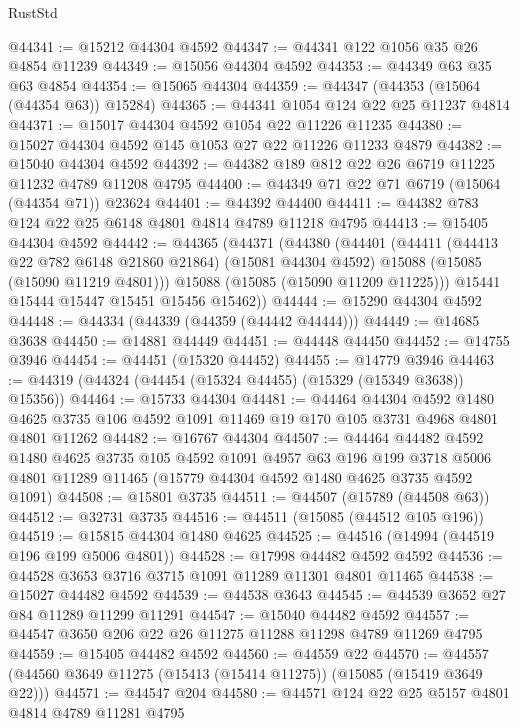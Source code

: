 \begin{lexlean}{RustStd}
\begin{coremodule}
@44341 := @15212 @44304 @4592
@44347 := @44341 @122 @1056 @35 @26 @4854 @11239
@44349 := @15056 @44304 @4592
@44353 := @44349 @63 @35 @63 @4854
@44354 := @15065 @44304
@44359 := @44347 (@44353 (@15064 (@44354 @63)) @15284)
@44365 := @44341 @1054 @124 @22 @25 @11237 @4814
@44371 := @15017 @44304 @4592 @1054 @22 @11226 @11235
@44380 := @15027 @44304 @4592 @145 @1053 @27 @22 @11226 @11233 @4879
@44382 := @15040 @44304 @4592
@44392 := @44382 @189 @812 @22 @26 @6719 @11225 @11232 @4789 @11208 @4795
@44400 := @44349 @71 @22 @71 @6719 (@15064 (@44354 @71)) @23624
@44401 := @44392 @44400
@44411 := @44382 @783 @124 @22 @25 @6148 @4801 @4814 @4789 @11218 @4795
@44413 := @15405 @44304 @4592
@44442 := @44365
    (@44371
      (@44380
        (@44401
          (@44411
            (@44413 @22 @782 @6148 @21860 @21864)
            (@15081 @44304 @4592)
            @15088
            (@15085 (@15090 @11219 @4801)))
          @15088
          (@15085 (@15090 @11209 @11225)))
        @15441
        @15444
        @15447
        @15451
        @15456
        @15462))
@44444 := @15290 @44304 @4592
@44448 := @44334 (@44339 (@44359 (@44442 @44444)))
@44449 := @14685 @3638
@44450 := @14881 @44449
@44451 := @44448 @44450
@44452 := @14755 @3946
@44454 := @44451 (@15320 @44452)
@44455 := @14779 @3946
@44463 := @44319 (@44324 (@44454 (@15324 @44455) (@15329 (@15349 @3638)) @15356))
@44464 := @15733 @44304
@44481 := @44464
    @44304
    @4592
    @1480
    @4625
    @3735
    @106
    @4592
    @1091
    @11469
    @19
    @170
    @105
    @3731
    @4968
    @4801
    @4801
    @11262
@44482 := @16767 @44304
@44507 := @44464
    @44482
    @4592
    @1480
    @4625
    @3735
    @105
    @4592
    @1091
    @4957
    @63
    @196
    @199
    @3718
    @5006
    @4801
    @11289
    @11465
    (@15779 @44304 @4592 @1480 @4625 @3735 @4592 @1091)
@44508 := @15801 @3735
@44511 := @44507 (@15789 (@44508 @63))
@44512 := @32731 @3735
@44516 := @44511 (@15085 (@44512 @105 @196))
@44519 := @15815 @44304 @1480 @4625
@44525 := @44516 (@14994 (@44519 @196 @199 @5006 @4801))
@44528 := @17998 @44482 @4592 @4592
@44536 := @44528 @3653 @3716 @3715 @1091 @11289 @11301 @4801 @11465
@44538 := @15027 @44482 @4592
@44539 := @44538 @3643
@44545 := @44539 @3652 @27 @84 @11289 @11299 @11291
@44547 := @15040 @44482 @4592
@44557 := @44547 @3650 @206 @22 @26 @11275 @11288 @11298 @4789 @11269 @4795
@44559 := @15405 @44482 @4592
@44560 := @44559 @22
@44570 := @44557 (@44560 @3649 @11275 (@15413 (@15414 @11275)) (@15085 (@15419 @3649 @22)))
@44571 := @44547 @204
@44580 := @44571 @124 @22 @25 @5157 @4801 @4814 @4789 @11281 @4795

\end{coremodule}
\end{lexlean}
